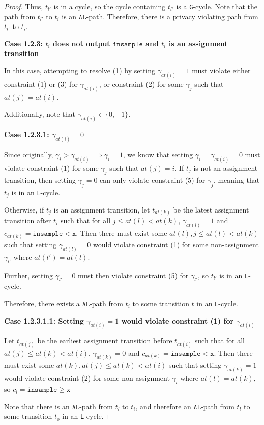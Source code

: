 \documentclass[12pt]{article}
\newcommand{\gguard}[1][x]{\texttt{insample}\geq #1}
\newcommand{\lguard}[1][x]{\texttt{insample} < #1}
\newcommand{\gcycle}{\texttt{G}-cycle}
\newcommand{\lcycle}{\texttt{L}-cycle}
\theoremstyle{definition}
\begin{document}
\begin{proof}
    Thus, $t_{l'}$ is in a cycle, so the cycle containing $t_{l'}$ is a \gcycle. Note that the path from $t_{l'}$ to $t_i$ is an $\texttt{AL}$-path. Therefore, there is a privacy violating path from $t_{l'}$ to $t_i$.

    \textbf{Case 1.2.3: $t_i$ does not output $\texttt{insample}$ and $t_i$ is an assignment transition}

    In this case, attempting to resolve (1) by setting $\gamma_{at(i)} = 1$ must violate either constraint (1) or (3) for $\gamma_{at(i)}$, or constraint (2) for some $\gamma_j$ such that $at(j) = at(i)$. 

    Additionally, note that $\gamma_{at(i)} \in \{0, -1\}$. 

    \textbf{Case 1.2.3.1: $\gamma_{at(i)} =0$}

    Since originally, $\gamma_i > \gamma_{at(i)} \implies \gamma_i = 1$, we know that setting $\gamma_i = \gamma_{at(i)} = 0$ must violate constraint (1) for some $\gamma_j$ such that $at(j) = i$. If $t_{j}$ is not an assignment transition, then setting $\gamma_{j} = 0$ can only violate constraint (5) for $\gamma_{j}$, meaning that $t_j$ is in an \lcycle.

    Otherwise, if $t_j$ is an assignment transition, let $t_{at(k)}$ be the latest assignment transition after $t_{i}$ such that for all $j\leq at(l)< at(k)$, $\gamma_{at(l)} =1$ and $c_{at(k)} = \lguard[\texttt{x}]$. Then there must exist some $at(l), j\leq at(l)< at(k)$ such that setting $\gamma_{at(l)}=0$ would violate constraint (1) for some non-assignment $\gamma_{l'}$ where $at(l') = at(l)$. 

    Further, setting $\gamma_{l'} = 0$ must then violate constraint (5) for $\gamma_{l'}$, so $t_{l'}$ is in an \lcycle. 

    Therefore, there exists a $\texttt{AL}$-path from $t_i$ to some transition $t$ in an \lcycle. 

    \textbf{Case 1.2.3.1.1: Setting $\gamma_{at(i)} = 1$ would violate constraint (1) for $\gamma_{at(i)}$}

    Let $t_{at(j)}$ be the earliest assignment transition before $t_{at(i)}$ such that for all $at(j)\leq at(k)< at(i)$, $\gamma_{at(k)} =0$ and $c_{at(k)} = \lguard[\texttt{x}]$. Then there must exist some $at(k), at(j)\leq at(k)< at(i)$ such that setting $\gamma_{at(k)}=1$ would violate constraint (2) for some non-assignment $\gamma_l$ where $at(l) = at(k)$, so $c_l = \gguard[\texttt{x}]$

    Note that there is an $\texttt{AL}$-path from $t_l$ to $t_i$, and therefore an $\texttt{AL}$-path from $t_l$ to some transition $t_{o}$ in an \lcycle. 


\end{proof}
\end{document}
